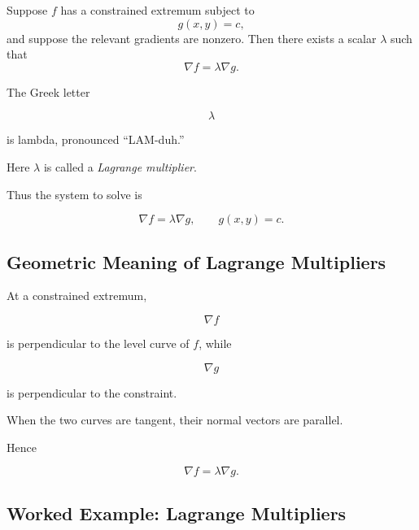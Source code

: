 \begin{theorem}
Suppose \(f\) has a constrained extremum subject to
\[ g(x,y)=c, \]
and suppose the relevant gradients are nonzero. Then there exists a scalar
\(\lambda\) such that
\[ \nabla f=\lambda\nabla g. \]
\end{theorem}

The Greek letter

\[ \lambda \]

is lambda, pronounced ``LAM-duh.''

Here \(\lambda\) is called a \emph{Lagrange multiplier}.

Thus the system to solve is

\[ \nabla f=\lambda\nabla g,\qquad g(x,y)=c. \]

\subsection{Geometric Meaning of Lagrange Multipliers}
\label{subsec:lagrange-geometry}

At a constrained extremum,

\[ \nabla f \]

is perpendicular to the level curve of \(f\), while

\[ \nabla g \]

is perpendicular to the constraint.

When the two curves are tangent, their normal vectors are parallel.

Hence

\[ \nabla f=\lambda\nabla g. \]

\begin{center}
\end{center}

\subsection{Worked Example: Lagrange Multipliers}
\label{subsec:worked-lagrange}

